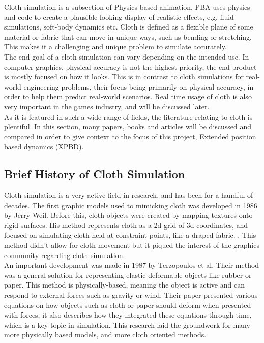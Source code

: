 \documentclass[12pt,a4paper]{article}
\begin{document}
Cloth simulation is a subsection of Physics-based animation. PBA uses physics and code to create a plausible looking display of realistic effects, e.g. fluid simulations, soft-body dynamics etc. Cloth is defined as a flexible plane of some material or fabric that can move in unique ways, such as bending or stretching. This makes it a challenging and unique problem to simulate accurately. \\

The end goal of a cloth simulation can vary depending on the intended use. In computer graphics, physical accuracy is not the highest priority, the end product is mostly focused on how it looks. This is in contrast to cloth simulations for real-world engineering problems, their focus being primarily on physical accuracy, in order to help them predict real-world scenarios. Real time usage of cloth is also very important in the games industry, and will be discussed later. \\

As it is featured in such a wide range of fields, the literature relating to cloth is plentiful. In this section, many papers, books and articles will be discussed and compared in order to give context to the focus of this project, Extended position based dynamics (XPBD).

\subsection{Brief History of Cloth Simulation}
\label{History}
Cloth simulation is a very active field in research, and has been for a handful of decades. The first graphic models used to mimicking cloth was developed in 1986 by Jerry Weil. Before this, cloth objects were created by mapping textures onto rigid surfaces. His method represents cloth as a 2d grid of 3d coordinates, and focused on simulating cloth held at constraint points, like a draped fabric. \cite{weil_synthesis_1986}. This method didn't allow for cloth movement but it piqued the interest of the graphics community regarding cloth simulation. \\

An important development was made in 1987 by Terzopoulos et al. Their method was a general solution for representing elastic deformable objects like rubber or paper. This method is physically-based, meaning the object is active and can respond to external forces such as gravity or wind. Their paper presented various equations on how objects such as cloth or paper should deform when presented with forces, it also describes how they integrated these equations through time, which is a key topic in simulation. This research laid the groundwork for many more physically based models, and more cloth oriented methods. \cite{terzopoulos1987elastically} \\
\end{document}
